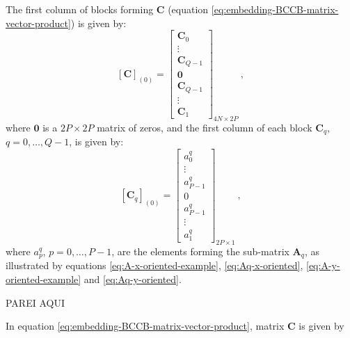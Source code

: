\documentclass[manuscript,revised]{geophysics}
\begin{document}
The first column of blocks forming $\mathbf{C}$ 
(equation \ref{eq:embedding-BCCB-matrix-vector-product}) is given by:
\begin{equation}
\left[\mathbf{C} \right]_{(0)} = 
	\begin{bmatrix}
	\mathbf{C}_{0} \\
	\vdots \\
	\mathbf{C}_{Q-1} \\
	\mathbf{0} \\
	\mathbf{C}_{Q-1} \\
	\vdots \\
	\mathbf{C}_{1}
	\end{bmatrix}_{4N \times 2P} \: ,
	\label{eq:C-first-column-blocks}
\end{equation}
where $\mathbf{0}$ is a $2P \times 2P$ matrix of zeros, 
and the first column of each block $\mathbf{C}_{q}$, $q = 0, \dots, Q-1$, is given by:
\begin{equation}
\left[\mathbf{C}_{q} \right]_{(0)} = 
	\begin{bmatrix}
		a^{q}_{0} \\
		\vdots \\
		a^{q}_{P-1} \\
		0 \\
		a^{q}_{P-1} \\
		\vdots \\
		a^{q}_{1}
	\end{bmatrix}_{2P \times 1} \: ,
	\label{eq:Cq-first-column}
\end{equation}
where $a^{q}_{p}$, $p = 0, \dots, P-1$, are the elements forming the sub-matrix 
$\mathbf{A}_{q}$, as illustrated by equations \ref{eq:A-x-oriented-example}, \ref{eq:Aq-x-oriented}, 
\ref{eq:A-y-oriented-example} and \ref{eq:Aq-y-oriented}.

PAREI AQUI

In equation \ref{eq:embedding-BCCB-matrix-vector-product}, matrix $\mathbf{C}$
is given by
\end{document}

